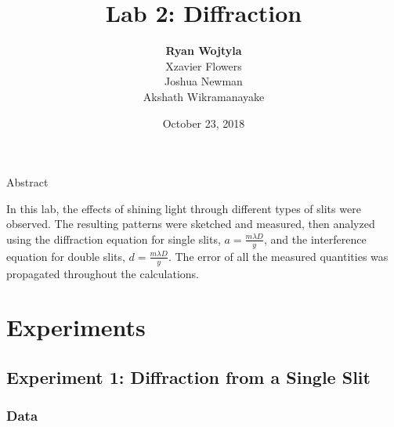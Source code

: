\documentclass[12pt]{article}
\begin{document}

\begin{titlepage}

  \title{Lab 2: Diffraction}
  \author{\textbf{Ryan Wojtyla} \\
    Xzavier Flowers \\
    Joshua Newman \\
    Akshath Wikramanayake \\}
  \date{October 23, 2018}

  \maketitle

\begin{center}
  {\Large Abstract}
\end{center}

\qq In this lab, the effects of shining light through different types of slits
were observed. The resulting patterns were sketched and measured, then analyzed
using the diffraction equation for single slits, \(a = \frac{m \lambda D}{y}\),
and the interference equation for double slits, \(d = \frac{m \lambda
  D}{y}\). The error of all the measured quantities was propagated throughout
the calculations.

\thispagestyle{empty}

\end{titlepage}


\section{Experiments}


\subsection{Experiment 1: Diffraction from a Single Slit}

\subsubsection{Data}
\end{document}
